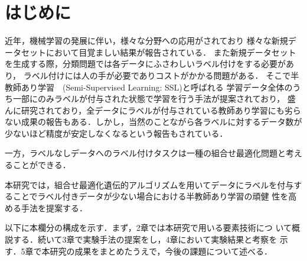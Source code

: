 \newpage
\changeindent{0cm}
\section{はじめに}
\changeindent{2cm}
近年，機械学習の発展に伴い，様々な分野への応用がされており
様々な新規データセットにおいて目覚ましい結果が報告されている．
また新規データセットを生成する際，分類問題では各データにふさわしいラベル付けをする必要があり，
ラベル付けには人の手が必要でありコストがかかる問題がある．
そこで半教師あり学習　(Semi-Supervised Learning: SSL)\cite{zhu2005semi}と呼ばれる
学習データ全体のうち一部にのみラベルが付与された状態で学習を行う手法が提案されており，
盛んに研究されており，全データにラベルが付与されている教師あり学習にも劣らない成果の報告\cite{sohn2020fixmatch}もある．しかし，当然のことながら各ラベルに対するデータ数が少ないほど精度が安定しなくなるという報告もされている．

一方，ラベルなしデータへのラベル付けタスクは一種の組合せ最適化問題と考えることができる．

本研究では，組合せ最適化遺伝的アルゴリズムを用いてデータにラベルを付与することでラベル付きデータが少ない場合における半教師あり学習の頑健
性を高める手法を提案する．

以下に本欄分の構成を示す．まず，2章では本研究で用いる要素技術につ
いて概説する．続いて3章で実験手法の提案をし，4章において実験結果と考察を
示す．5章で本研究の成果をまとめたうえで，今後の課題について述べる．


